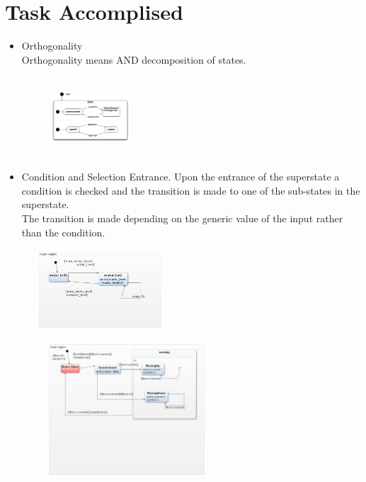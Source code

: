 \documentclass[10pt, a4paper]{beamer}
\begin{document}
                 \section{Task Accomplised}
              \begin{frame}
                \begin{itemize} 
                 \item Orthogonality\\
           Orthogonality means AND decomposition of states.\\
           \begin{figure}[h]
                \centering
                \includegraphics[width=3cm,height=3cm]{switch.png}
                \end{figure}
            \item Condition and Selection Entrance.
            Upon the entrance of the superstate a condition is checked and the transition is made to one of the sub-states in the superstate.\\
            The transition is made depending on the generic value of the input rather than the condition.\\
            \end{itemize}
            \end{frame}
            \begin{frame}
            \begin{figure}[h]
                \centering
                \includegraphics[width=5cm,height=3cm]{water.jpg}
                \end{figure}
                \begin{figure}[h]
                \centering
                \includegraphics[width=7cm,height=5cm]{elevator.jpg}
                \end{figure}
                \end{frame}
\end{document}

